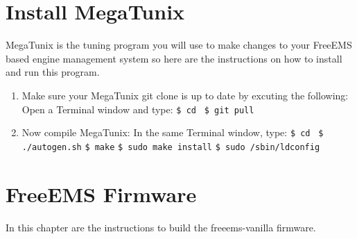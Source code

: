 \documentclass[12pt,notitlepage,onecolumn,oneside,openany]{memoir}
\begin{document}
\chapter{\textsf{Install MegaTunix}}

\textsf{MegaTunix is the tuning program you will use to make changes to your FreeEMS based engine management system so here are the instructions on how to install and run this program.} \newline

\begin{enumerate}
\item \textsf{Make sure your MegaTunix git clone is up to date by excuting the following:} \newline
      \textsf{Open a Terminal window and type:} \newline
      \texttt{\$ cd }  \newline
      \texttt{\$ git pull}

\item \textsf{Now compile MegaTunix:} \newline
      \textsf{In the same Terminal window, type:} \newline
      \texttt{\$ cd }  \newline
      \texttt{\$ ./autogen.sh} \newline
      \texttt{\$ make} \newline
      \texttt{\$ sudo make install} \newline
      \texttt{\$ sudo /sbin/ldconfig} \newline
\end{enumerate}

\chapter{\textsf{FreeEMS Firmware}}

\textsf{In this chapter are the instructions to build the freeems-vanilla firmware.} \newline
\end{document}
